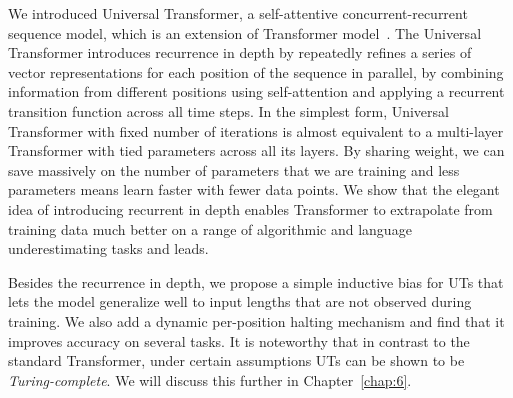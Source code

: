 We introduced Universal Transformer, a self-attentive concurrent-recurrent sequence model, which is an extension of Transformer model~\citep{vaswani2017attention}. The Universal Transformer introduces recurrence in depth by repeatedly refines a series of vector representations for each position of the sequence in parallel, by combining information from different positions using self-attention and applying a recurrent transition function across all time steps. 
In the simplest form, Universal Transformer with fixed number of iterations is almost equivalent to a multi-layer Transformer with tied parameters across all its layers. By sharing weight, we can save massively on the number of parameters that we are training and less parameters means learn faster with fewer data points. We show that the elegant idea of introducing recurrent in depth enables Transformer to extrapolate from training data much better on a range of algorithmic and language underestimating tasks and leads.

Besides the recurrence in depth, we propose a simple inductive bias for UTs that lets the model generalize well to input lengths that are not observed during training.  We also add a dynamic per-position halting mechanism and find that it improves accuracy on several tasks.  It is noteworthy that in contrast to the standard Transformer, under certain assumptions UTs can be shown to be \emph{Turing-complete}. We will discuss this further in Chapter~\ref{chap:6}.





